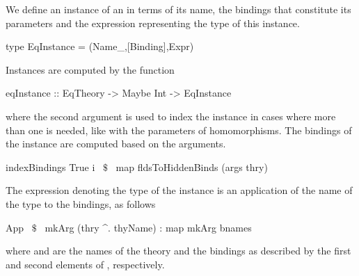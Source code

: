 We define an instance of an  in terms of its name, the bindings that constitute its parameters and the expression representing the type of this instance. 
\begin{hscode}
type EqInstance = (Name_,[Binding],Expr) 
\end{hscode}
Instances are computed by the function 
\begin{hscode} 
eqInstance :: EqTheory -> Maybe Int -> EqInstance
\end{hscode}
where the second argument is used to index the instance in cases where more than one is needed, like with the parameters of homomorphisms. The bindings of the instance are computed based on the arguments. 
\begin{hscode}
 indexBindings True i ~$\$$~ map fldsToHiddenBinds (args thry)
\end{hscode}
The expression denoting the type of the instance is an application of the name of the type to the bindings, as follows 
\begin{hscode}
 App ~$\$$~ mkArg (thry ^. thyName) : map mkArg bnames
\end{hscode} 
where  and  are the names of the theory and the bindings as described by the first and second elements of , respectively. 

